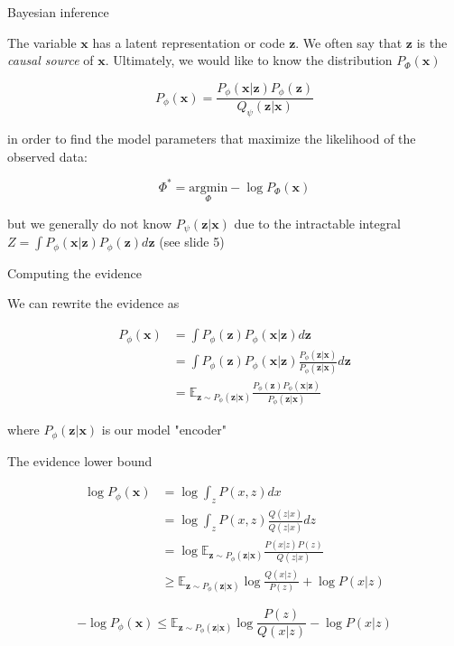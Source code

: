 \documentclass{beamer}					%
\begin{document}
\begin{frame}{Bayesian inference}

The variable $\mathbf{x}$ has a latent representation or code $\mathbf{z}$. We often say that $\mathbf{z}$ is the \emph{causal source} of $\mathbf{x}$. Ultimately, we would like to know the distribution $P_{\Phi}(\mathbf{x})$

\begin{equation*}
P_{\phi}(\mathbf{x}) = \frac{P_{\phi}(\mathbf{x|z})P_{\phi}(\mathbf{z})}{Q_{\psi}(\mathbf{z|x})}
\end{equation*}

in order to find the model parameters that maximize the likelihood of the observed data:

\begin{equation*}
\Phi^{*} = \underset{\Phi}{\mathrm{argmin}} -\log P_{\Phi}(\mathbf{x}) 
\end{equation*}

but we generally do not know $P_{\psi}(\mathbf{z|x})$ due to the intractable integral $Z = \int P_{\phi}(\mathbf{x|z})P_{\phi}(\mathbf{z})d\mathbf{z}$ (see slide 5)

\end{frame}

\begin{frame}{Computing the evidence}

We can rewrite the evidence as

\begin{align*}
P_{\phi}(\mathbf{x}) &= \int P_{\phi}(\mathbf{z})P_{\phi}(\mathbf{x|z})d\mathbf{z}\\
&= \int P_{\phi}(\mathbf{z})P_{\phi}(\mathbf{x|z})\frac{P_{\phi}(\mathbf{z|x})}{P_{\phi}(\mathbf{z|x})}d\mathbf{z}\\
&= \mathbb{E}_{\mathbf{z}\sim P_{\phi}(\mathbf{z|x})} \frac{P_{\phi}(\mathbf{z})P_{\phi}(\mathbf{x|z})}{P_{\phi}(\mathbf{z|x})}
\end{align*}

where $P_{\phi}(\mathbf{z|x})$ is our model "encoder"

\end{frame}

\begin{frame}{The evidence lower bound}

\begin{align*}
\log P_{\phi}(\mathbf{x}) &= \log \int_{z}P(x,z)dx\\
&= \log \int_{z} P(x,z)\frac{Q(z|x)}{Q(z|x)}dz\\
&= \log \mathbb{E}_{\mathbf{z}\sim P_{\phi}(\mathbf{z|x})} \frac{P(x|z)P(z)}{Q(z|x)}\\
&\geq \mathbb{E}_{\mathbf{z}\sim P_{\phi}(\mathbf{z|x})} \log \frac{Q(x|z)}{P(z)} + \log P(x|z)
\end{align*}

\begin{equation*}
-\log P_{\phi}(\mathbf{x}) \leq \mathbb{E}_{\mathbf{z}\sim P_{\phi}(\mathbf{z|x})} \log \frac{P(z)}{Q(x|z)} - \log P(x|z)
\end{equation*}


\end{frame}
\end{document}
